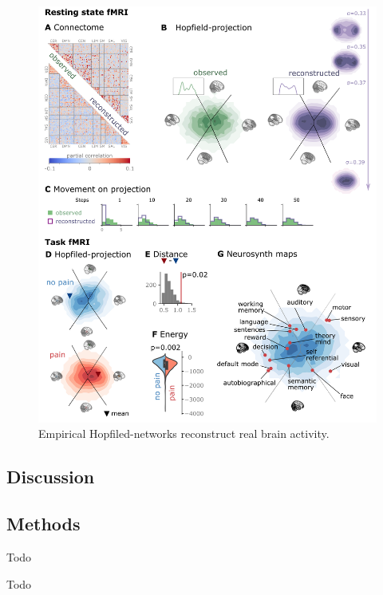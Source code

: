 \documentclass[twocolumn, switch]{article}
\begin{document}
\begin{figure}[!htbp]
\centering
\includegraphics[width=0.7\linewidth]{files/face_validity-9bf8c552101cf70d6a97f3dc57f28140.png}
\caption{Empirical Hopfiled-networks reconstruct real brain activity.}
\label{Figure 1}
\end{figure}

\subsection{Discussion}\label{Discussion}

\subsection{Methods}\label{Methods}

Todo

Todo




\end{document}
